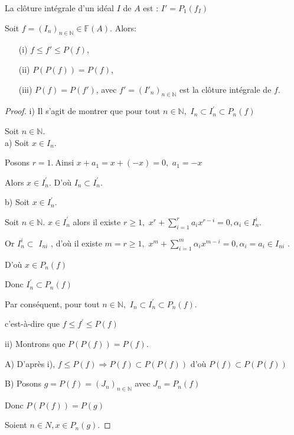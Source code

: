 \begin{maremarque}
	La clôture intégrale d'un idéal $I$ de $A$ est : $I'=P_1(f_I)$
\end{maremarque}
\begin{maproposition}
	Soit $f=(I_n)_{n \in \mathbb{N}} \in \mathbb{F}(A)$. Alors:\\
	\begin{enumerate}
		\item[(i)] $ f \leqslant f' \leqslant P(f)$,
		\item[(ii)] $ P(P(f)) = P(f)$,
		\item[(iii)] $P(f) = P(f')$, avec $f'=(I'_n)_{n \in \mathbb{N}}$ est la clôture intégrale de $f$.
	\end{enumerate}
\end{maproposition}
\begin{proof}
	i) Il s'agit de montrer que pour tout $n\in \mathbb{N},$ $I_{n}\subset I_{n}^{\prime }\subset P_{n}(f)$
	
	Soit $n\in \mathbb{N}.$ \\
	a) Soit $x\in I_{n}.$
	
	Posons $r=1.~$Ainsi $x+a_{1}=x+(-x)=0,$ $a_{1}=-x$
	
	Alors $x\in I_{n}^{\prime }.$ D'où $I_{n}\subset I_{n}^{\prime }.$
	
	b) Soit $x\in I_{n}^{\prime }.$
	
	Soit $n\in \mathbb{N}.$
	$x\in I_{n}^{\prime }$ alors il existe $r\geq 1,$ $x^{r}+\sum%
	\limits_{i=1}^{r}a_{i}x^{r-i}=0,\alpha _{i}\in I_{n}^{i}$.
	
	Or $I_{n}^{i}\subset $ $I_{ni}$ , d'où il existe $m=r\geq 1,$ $%
	x^{m}+\sum\limits_{i=1}^{m}\alpha _{i}x^{m-i}=0,\alpha _{i}=a_{i}\in I_{ni}$%
	.
	
	D'où $x\in P_{n}(f)$
	
	Donc $I_{n}^{\prime }\subset P_{n}(f)$
	
	Par conséquent, pour tout $n\in \mathbb{N},$ $I_{n}\subset I_{n}^{\prime }\subset P_{n}(f).$
	
	c'est-\`{a}-dire que $f\leq f^{\prime }\leq P(f)$
	
	ii) Montrons que $P(P(f))=P(f).$
	
	A) D'après i), $f\leq P(f)\Rightarrow P(f)\subset P(P(f))$ d'où $%
	P(f)\subset P(P(f))$
	
	B) Posons $g=P(f)=(J_{n})_{n\in \mathbb{N}}$ avec $J_{n}=P_{n}(f)$
	
	Donc $P(P(f))=P(g)$
	
	Soient $n\in N,x\in P_{n}(g).$
	

\end{proof}
